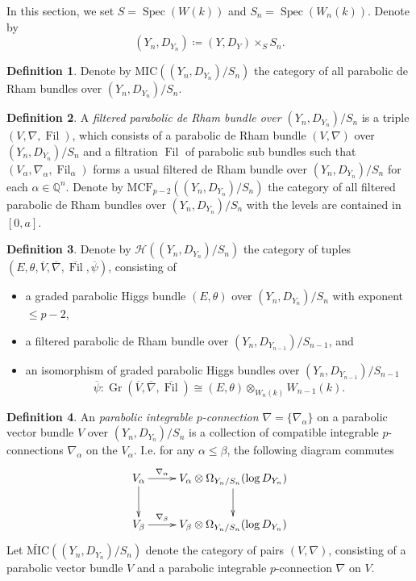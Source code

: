 \documentclass[12pt,twoside]{book}
\theoremstyle{plain}
\theoremstyle{definition}
\newtheorem{definition}[definition]{Definition}
\theoremstyle{remark}
\newcommand{\bQ}{{\mathbb Q}}
\newcommand{\mH}{{\mathcal H}}
\DeclareMathOperator\Fil{Fil}
\DeclareMathOperator\Gr{Gr}
\DeclareMathOperator\Spec{Spec}
\newcommand{\MCF}{\mathrm{MCF}}
\newcommand{\MIC}{\mathrm{MIC}}
\numberwithin{equation}{section}
\begin{document}
In this section, we set $S=\Spec(W(k))$ and $S_n = \Spec(W_n(k))$. Denote by
\[(Y_n,D_{Y_n})\coloneqq (Y,D_Y)\times_SS_n.\]

\begin{definition}
Denote by $\MIC((Y_n,D_{Y_n})/S_n)$ the category of all parabolic de Rham bundles over $(Y_n,D_{Y_n})/S_n$.
\end{definition}

\begin{definition}
A \emph{filtered parabolic de Rham bundle over $(Y_n,D_{Y_n})/S_n$} is a triple $(V,\nabla,\Fil)$, which consists of a parabolic de Rham bundle $(V,\nabla)$ over $(Y_n,D_{Y_n})/S_n$ and a filtration $\Fil$ of parabolic sub bundles such that $(V_\alpha,\nabla_\alpha,\Fil_\alpha)$ forms a usual filtered de Rham bundle over $(Y_n,D_{Y_n})/S_n$ for each $\alpha\in \bQ^n$. Denote by \emph{$\MCF_{p-2}((Y_n,D_{Y_n})/S_n)$} the category of all filtered parabolic de Rham bundles over $(Y_n,D_{Y_n})/S_n$ with the levels are contained in $[0,a]$.
\end{definition}

\begin{definition}
Denote by \emph{$\mH((Y_n,D_{Y_n})/S_n)$} the category of tuples $(E,\theta,\overline{V},\overline{\nabla},\overline{\Fil},\overline{\psi})$, consisting of
\begin{itemize}
\item a graded parabolic Higgs bundle $(E,\theta)$ over $(Y_n,D_{Y_n})/S_n$ with exponent $\leq p-2$,
\item a filtered parabolic de Rham bundle over $(Y_n,D_{Y_{n-1}})/S_{n-1}$, and
\item an isomorphism of graded parabolic Higgs bundles over $(Y_n,D_{Y_{n-1}})/S_{n-1}$
\[\overline{\psi}\colon \Gr(\overline{V},\overline{\nabla},\overline{\Fil}) \cong (E,\theta)\otimes_{W_n(k)} W_{n-1}(k).\]
\end{itemize}
\end{definition}

\begin{definition}
An \emph{parabolic integrable $p$-connection $\nabla=\{\nabla_\alpha\}$} on a parabolic vector bundle $V$ over $(Y_n,D_{Y_n})/S_n$ is a collection of compatible integrable $p$-connections $\nabla_\alpha$ on the $V_\alpha$. I.e. for any $\alpha\leq\beta$, the following diagram commutes
\begin{equation*}
\xymatrix{
V_\alpha \ar[r]^-{\nabla_\alpha} \ar[d] & V_\alpha \otimes \Omega_{Y_n/S_n}(\log D_{Y_n}) \ar[d] \\
V_\beta \ar[r]^-{\nabla_\beta} & V_\beta \otimes \Omega_{Y_n/S_n}(\log D_{Y_n})\\
}
\end{equation*}
Let \emph{$\widetilde{\MIC}((Y_n,D_{Y_n})/S_n)$} denote the category of pairs $(V,\nabla)$, consisting of a parabolic vector bundle $V$ and a parabolic integrable $p$-connection $\nabla$ on $V$.
\end{definition}
\end{document}
